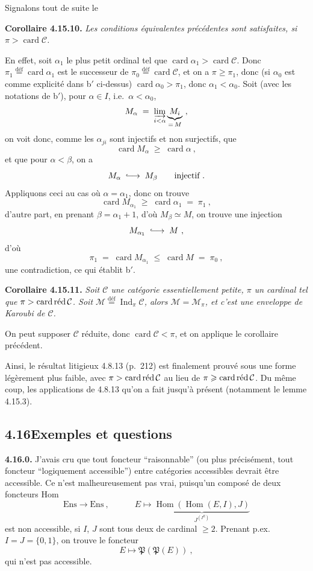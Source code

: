 \documentclass[11pt]{article}
\newcommand{\printedpage}[1]{\marginpar{\footnotesize p.~#1}}
\newcommand{\msp}[1]{\marginpar{\footnotesize [#1]}}
\newcommand{\card}{\operatorname{card}}
\newcommand{\redop}{\mathop{\textnormal{réd}}\nolimits}
\newcommand{\Hom}{\operatorname{Hom}}
\newcommand{\Ind}{\operatorname{Ind}}
\newcommand{\Ens}{\mathrm{Ens}}
\newcommand{\defeq}{\overset{\text{déf}}{=}}
\newcommand{\into}{\lhook\joinrel\longrightarrow}
\begin{document}
\printedpage{179}

Signalons tout de suite le

\textbf{Corollaire 4.15.10.} \textit{Les conditions équivalentes précédentes sont satisfaites, si $\pi > \card\mathcal{C}$.}

En effet, soit $\alpha_1$ le plus petit ordinal tel que $\card\alpha_1 > \card\mathcal{C}$. Donc $\pi_1 \defeq \card\alpha_1$ est le successeur de $\pi_0 \defeq \card\mathcal{C}$, et on a $\pi \geqslant \pi_1$, donc (si $\alpha_0$ est comme explicité dans b$'$ ci-dessus) $\card\alpha_0 > \pi_1$, donc $\alpha_1 < \alpha_0$. Soit (avec les notations de b$'$), pour $\alpha \in I$, i.e.\ $\alpha < \alpha_0$,
\[
M_\alpha \;=\; \varinjlim_{i<\alpha} \underbrace{M_i}_{=\,M}\ ,
\]
on voit donc, comme les $\alpha_{ji}$ sont injectifs et non surjectifs, que
\[
\card M_\alpha \;\geqslant\; \card\alpha\ ,
\]
\msp{463}
et que pour $\alpha < \beta$, on a
\[
M_\alpha \;\into\; M_\beta \qquad \text{injectif}\ .
\]
Appliquons ceci au cas où $\alpha = \alpha_1$, donc on trouve
\[
\card M_{\alpha_1} \;\geqslant\; \card\alpha_1 \;=\; \pi_1\ ,
\]
d'autre part, en prenant $\beta = \alpha_1 + 1$, d'où $M_\beta \simeq M$, on trouve une injection
\[
M_{\alpha_1} \;\into\; M\ ,
\]
d'où
\[
\pi_1 \;=\; \card M_{\alpha_1} \;\leqslant\; \card M \;=\; \pi_0\ ,
\]
une contradiction, ce qui établit b$'$.

\textbf{Corollaire 4.15.11.} \textit{Soit $\mathcal{C}$ une catégorie essentiellement petite, $\pi$ un cardinal tel que $\pi > \card\redop\mathcal{C}$. Soit $\mathcal{M} \defeq \Ind_\pi\mathcal{C}$, alors $\mathcal{M} = \mathcal{M}_\pi$, et c'est une enveloppe de Karoubi de $\mathcal{C}$.}

On peut supposer $\mathcal{C}$ réduite, donc $\card\mathcal{C} < \pi$, et on applique le corollaire précédent.

Ainsi, le résultat litigieux 4.8.13 (p.~212) est finalement prouvé sous une forme légèrement plus faible, avec $\pi > \card\redop\mathcal{C}$ au lieu de $\pi \geqslant \card\redop\mathcal{C}$. Du même coup, les applications de 4.8.13 qu'on a fait jusqu'à présent (notamment le lemme 4.15.3).

\msp{464}

\subsection*{4.16\quad Exemples et questions}

\textbf{4.16.0.} J'avais cru que tout foncteur “raisonnable” (ou plus précisément, tout foncteur “logiquement accessible”) entre catégories accessibles devrait être accessible. Ce n'est malheureusement pas vrai, puisqu'un composé de deux foncteurs Hom
\[
\Ens \longrightarrow \Ens\ , \qquad\quad E \longmapsto \underbrace{\Hom(\Hom(E,I),J)}_{J^{(I^E)}}
\]
\printedpage{180}
est non accessible, si $I$, $J$ sont tous deux de cardinal $\geqslant 2$. Prenant p.ex.\ $I = J = \{0,1\}$, on trouve le foncteur
\[
E \longmapsto \mathfrak{P}(\mathfrak{P}(E))\ ,
\]
qui n'est pas accessible.
\end{document}
